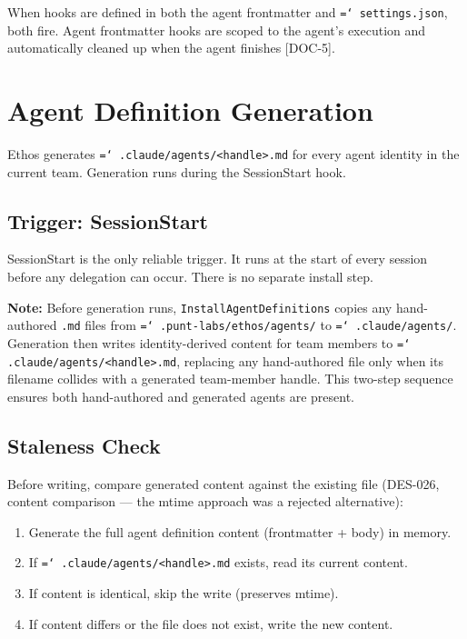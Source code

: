 \documentclass[a4paper,10pt]{article}
\newcommand{\fpath}[1]{\texttt{\hyphenchar\font=`\/ #1}}
\newcommand{\cmd}[1]{\texttt{#1}}
\newcommand{\coderef}[1]{\textsf{\small [#1]}}
\begin{document}
When hooks are defined in both the agent frontmatter and
\fpath{settings.json}, both fire. Agent frontmatter hooks are
scoped to the agent's execution and automatically cleaned up when
the agent finishes \coderef{DOC-5}.

\section{Agent Definition Generation}
\label{sec:generation}

Ethos generates \fpath{.claude/agents/<handle>.md} for every agent
identity in the current team. Generation runs during the
SessionStart hook.

\subsection{Trigger: SessionStart}

SessionStart is the only reliable trigger. It runs at the start of
every session before any delegation can occur. There is no separate
install step.

\medskip
\noindent\textbf{Note:} Before generation runs,
\cmd{InstallAgentDefinitions} copies any hand-authored \texttt{.md}
files from \fpath{.punt-labs/ethos/agents/} to
\fpath{.claude/agents/}. Generation then writes identity-derived content for team members
to \fpath{.claude/agents/<handle>.md}, replacing any hand-authored
file only when its filename collides with a generated team-member
handle. This two-step sequence ensures both hand-authored and
generated agents are present.

\subsection{Staleness Check}

Before writing, compare generated content against the existing file
(DES-026, content comparison --- the mtime approach was a rejected
alternative):

\begin{enumerate}
  \item Generate the full agent definition content (frontmatter +
    body) in memory.
  \item If \fpath{.claude/agents/<handle>.md} exists, read its
    current content.
  \item If content is identical, skip the write (preserves mtime).
  \item If content differs or the file does not exist, write the new
    content.
\end{enumerate}
\end{document}

